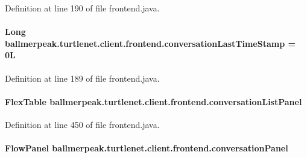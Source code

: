 Definition at line 190 of file frontend.\-java.

\hypertarget{classballmerpeak_1_1turtlenet_1_1client_1_1frontend_a97ea23587c248a189f579102c29a0fc9}{
\paragraph[{conversation\-Last\-Time\-Stamp}]{\setlength{\rightskip}{0pt plus 5cm}Long ballmerpeak.\-turtlenet.\-client.\-frontend.\-conversation\-Last\-Time\-Stamp = 0\-L\hspace{0.3cm}{\ttfamily [package]}}}\label{classballmerpeak_1_1turtlenet_1_1client_1_1frontend_a97ea23587c248a189f579102c29a0fc9}


Definition at line 189 of file frontend.\-java.

\hypertarget{classballmerpeak_1_1turtlenet_1_1client_1_1frontend_ad41191c45ac70b949585a24904a7f83a}{
\paragraph[{conversation\-List\-Panel}]{\setlength{\rightskip}{0pt plus 5cm}Flex\-Table ballmerpeak.\-turtlenet.\-client.\-frontend.\-conversation\-List\-Panel\hspace{0.3cm}{\ttfamily [package]}}}\label{classballmerpeak_1_1turtlenet_1_1client_1_1frontend_ad41191c45ac70b949585a24904a7f83a}


Definition at line 450 of file frontend.\-java.

\hypertarget{classballmerpeak_1_1turtlenet_1_1client_1_1frontend_a98647f4c02d7c216346e1b4dd3ca499d}{
\paragraph[{conversation\-Panel}]{\setlength{\rightskip}{0pt plus 5cm}Flow\-Panel ballmerpeak.\-turtlenet.\-client.\-frontend.\-conversation\-Panel\hspace{0.3cm}{\ttfamily [private]}}}\label{classballmerpeak_1_1turtlenet_1_1client_1_1frontend_a98647f4c02d7c216346e1b4dd3ca499d}


